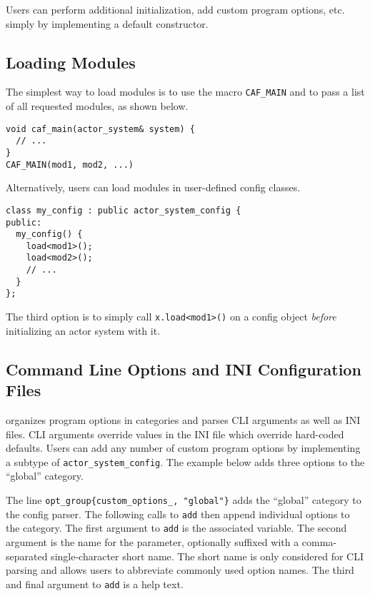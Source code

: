 Users can perform additional initialization, add custom program options, etc. simply by implementing a default constructor.

\subsection{Loading Modules}
\label{system-config-module}

The simplest way to load modules is to use the macro \lstinline^CAF_MAIN^ and to pass a list of all requested modules, as shown below.

\begin{lstlisting}
void caf_main(actor_system& system) {
  // ...
}
CAF_MAIN(mod1, mod2, ...)
\end{lstlisting}

Alternatively, users can load modules in user-defined config classes.

\begin{lstlisting}
class my_config : public actor_system_config {
public:
  my_config() {
    load<mod1>();
    load<mod2>();
    // ...
  }
};
\end{lstlisting}

The third option is to simply call \lstinline^x.load<mod1>()^ on a config object \emph{before} initializing an actor system with it.

\subsection{Command Line Options and INI Configuration Files}
\label{system-config-options}

\lib organizes program options in categories and parses CLI arguments as well as INI files. CLI arguments override values in the INI file which override hard-coded defaults. Users can add any number of custom program options by implementing a subtype of \lstinline^actor_system_config^. The example below adds three options to the ``global'' category.



The line \lstinline^opt_group{custom_options_, "global"}^ adds the ``global'' category to the config parser. The following calls to \lstinline^add^ then append individual options to the category. The first argument to \lstinline^add^ is the associated variable. The second argument is the name for the parameter, optionally suffixed with a comma-separated single-character short name. The short name is only considered for CLI parsing and allows users to abbreviate commonly used option names. The third and final argument to \lstinline^add^ is a help text.


